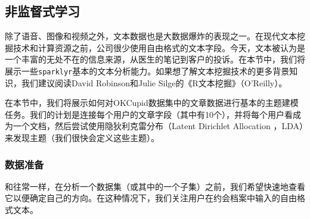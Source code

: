 \documentclass[
]{article}
\begin{document}
\hypertarget{ux975eux76d1ux7763ux5f0fux5b66ux4e60}{%
\subsection{非监督式学习}\label{ux975eux76d1ux7763ux5f0fux5b66ux4e60}}

除了语音、图像和视频之外，文本数据也是大数据爆炸的表现之一。在现代文本挖掘技术和计算资源之前，公司很少使用自由格式的文本字段。今天，文本被认为是一个丰富的无处不在的信息来源，从医生的笔记到客户的投诉。在本节中，我们将展示一些\texttt{sparklyr}基本的文本分析能力。如果想了解文本挖掘技术的更多背景知识，我们建议阅读David
Robinson和Julie Silge的《R文本挖掘》（O'Reilly）。

在本节中，我们将展示如何对OKCupid数据集中的文章数据进行基本的主题建模任务。我们的计划是连接每个用户的文章字段（其中有10个），并将每个用户看成为一个文档，然后尝试使用隐狄利克雷分布（Latent
Dirichlet Allocation ，LDA）来发现主题（我们很快会定义这些主题）。

\hypertarget{ux6570ux636eux51c6ux5907}{%
\subsubsection{数据准备}\label{ux6570ux636eux51c6ux5907}}

和往常一样，在分析一个数据集（或其中的一个子集）之前，我们希望快速地查看它以便确定自己的方向。在这种情况下，我们关注用户在约会档案中输入的自由格式文本。
\end{document}
